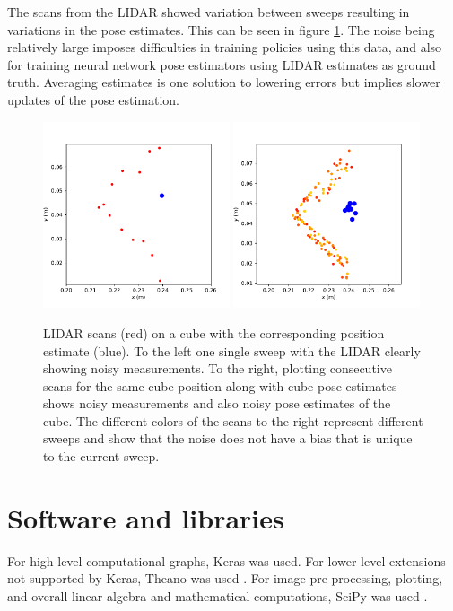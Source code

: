 The scans from the LIDAR showed variation between sweeps resulting in
variations in the pose estimates. This can be seen in figure
\ref{fig:lidar_noise}. The noise being relatively large imposes difficulties in
training policies using this data, and also for training neural network pose
estimators using LIDAR estimates as ground truth. Averaging estimates is one
solution to lowering errors but implies slower updates of the pose estimation.

\begin{figure}[h]
    \centering
    \includegraphics[width=0.49\textwidth]{res/cube_pose_lidar_one_scan.pdf}
    \includegraphics[width=0.49\textwidth]{res/cube_pose_lidar_variance.pdf}

    \caption{LIDAR scans (red) on a cube with the corresponding position
    estimate (blue). To the left one single sweep with the LIDAR clearly
    showing noisy measurements. To the right, plotting consecutive scans for
    the same cube position along with cube pose estimates shows noisy
    measurements and also noisy pose estimates of the cube. The different
    colors of the scans to the right represent different sweeps and show that
    the noise does not have a bias that is unique to the current sweep.}

    \label{fig:lidar_noise}
\end{figure}

\section{Software and libraries}

For high-level computational graphs, Keras \cite{chollet2015keras} was used.
For lower-level extensions not supported by Keras, Theano was used
\cite{theano2016theano}. For image pre-processing, plotting, and overall linear
algebra and mathematical computations, SciPy was used \cite{scipy2016scipy}.
